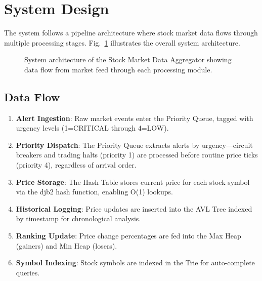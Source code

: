\documentclass[conference]{IEEEtran}
\begin{document}
\section{System Design}

The system follows a pipeline architecture where stock market data flows through multiple processing stages. Fig.~\ref{fig:arch} illustrates the overall system architecture.

\begin{figure}[htbp]
\centering
{}
\caption{System architecture of the Stock Market Data Aggregator showing data flow from market feed through each processing module.}
\label{fig:arch}
\end{figure}

\subsection{Data Flow}

\begin{enumerate}
\item \textbf{Alert Ingestion}: Raw market events enter the Priority Queue, tagged with urgency levels (1=CRITICAL through 4=LOW).
\item \textbf{Priority Dispatch}: The Priority Queue extracts alerts by urgency---circuit breakers and trading halts (priority 1) are processed before routine price ticks (priority 4), regardless of arrival order.
\item \textbf{Price Storage}: The Hash Table stores current price for each stock symbol via the djb2 hash function, enabling O(1) lookups.
\item \textbf{Historical Logging}: Price updates are inserted into the AVL Tree indexed by timestamp for chronological analysis.
\item \textbf{Ranking Update}: Price change percentages are fed into the Max Heap (gainers) and Min Heap (losers).
\item \textbf{Symbol Indexing}: Stock symbols are indexed in the Trie for auto-complete queries.
\end{enumerate}
\end{document}
